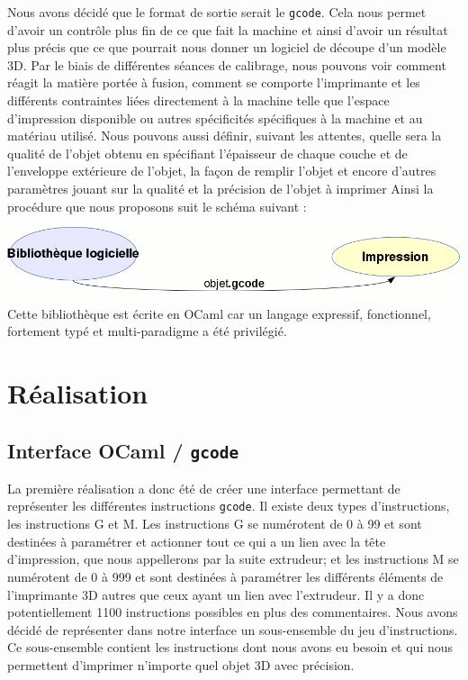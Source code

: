 \documentclass[11pt, titlepage]{article}
\begin{document}
Nous avons décidé que le format de sortie serait le \verb&gcode&. Cela nous permet d'avoir un contrôle plus fin de ce que fait la machine et ainsi d'avoir un résultat plus précis que ce que pourrait nous donner un logiciel de découpe d'un modèle 3D.
Par le biais de différentes séances de calibrage, nous pouvons voir comment réagit la matière portée à fusion, comment se comporte l'imprimante et les différents contraintes liées directement à la machine telle que l'espace d'impression disponible ou autres spécificités spécifiques à la machine et au matériau utilisé.
Nous pouvons aussi définir, suivant les attentes, quelle sera la qualité de l'objet obtenu en spécifiant l'épaisseur de chaque couche et de l'enveloppe extérieure de l'objet, la façon de remplir l'objet et encore d'autres paramètres jouant sur la qualité et la précision de l'objet à imprimer
Ainsi la procédure que nous proposons suit le schéma suivant :
\includegraphics[scale=1]{img/Motivation.gif} 
Cette bibliothèque est écrite en OCaml car un langage expressif, fonctionnel, fortement typé et multi-paradigme a été privilégié.

\newpage
\section{Réalisation}

\subsection{Interface OCaml / \verb&gcode&}
La première réalisation a donc été de créer une interface permettant de représenter les différentes instructions \verb&gcode&. Il existe deux types d'instructions, les instructions G et M. Les instructions G se numérotent de 0 à 99 et sont destinées à paramétrer et actionner tout ce qui a un lien avec la tête d'impression, que nous appellerons par la suite extrudeur; et les instructions M se numérotent de 0 à 999 et sont destinées à paramétrer les différents éléments de l'imprimante 3D autres que ceux ayant un lien avec l'extrudeur. Il y a donc potentiellement 1100 instructions possibles en plus des commentaires.
Nous avons décidé de représenter dans notre interface un sous-ensemble du jeu d'instructions. Ce sous-ensemble contient les instructions dont nous avons eu besoin et qui nous permettent d'imprimer n'importe quel objet 3D avec précision.
\newline
\end{document}
